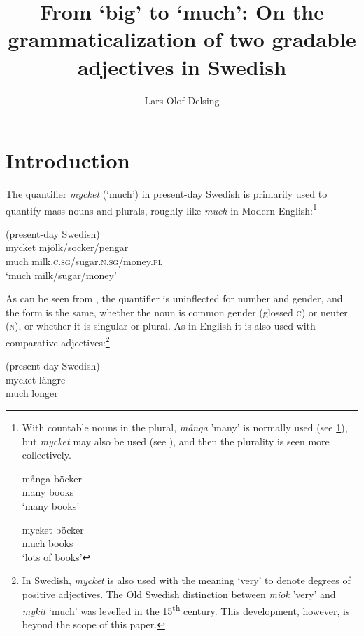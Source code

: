 \documentclass[output=paper]{langscibook}
\author{Lars-Olof Delsing\orcid{}\affiliation{Lund University}}
\title[From ‘big’ to ‘much’]{From ‘big’ to ‘much’: On the grammaticalization of two gradable adjectives in Swedish}
\begin{document}
 \maketitle

\section{Introduction}\label{sec:delsing:1}


The quantifier \textit{mycket} (‘much’) in present-day Swedish is primarily used to quantify mass nouns and plurals, roughly like \textit{much} in Modern English:\footnote{With
 countable nouns in the plural, \textit{många} ’many’ is normally used (see \ref{ex:delsing:fni}), but \textit{mycket} may also be used (see ), and then the plurality is seen more collectively.

    \ea\label{ex:delsing:fni}
    \ea
    \gll många    böcker      \\
    many      books           \\
    \glt ‘many books’

    \ex\label{ex:delsing:fnii}
    \gll mycket   böcker\\
    much     books\\
    \glt  ‘lots of books’
    \z
    \z
}


\ea\label{ex:delsing:1}
(present-day Swedish)\\
\gll mycket  mjölk/socker/pengar\\
much      milk.\textsc{c}.\textsc{sg}/sugar.\textsc{n.sg}/money.\textsc{pl}\\
\glt `much milk/sugar/money'
\z

As can be seen from , the quantifier is uninflected for number and gender, and the form is the same, whether the noun is common gender (glossed \textsc{c}) or neuter (\textsc{n}), or whether it is singular or plural. As in English it is also used with comparative adjectives:\footnote{In
 Swedish, \textit{mycket} is also used with the meaning ‘very’ to denote degrees of positive adjectives. The Old Swedish distinction between \textit{miok} ’very’ and \textit{mykit} ‘much’ was levelled in the 15\textsuperscript{th} century. This development, however, is beyond the scope of this paper.
}


\ea\label{ex:delsing:2}
(present-day Swedish)\\
\gll mycket  längre\\
much      longer\\
\z
\end{document}
